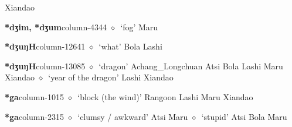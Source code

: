          Xiandao 
  \item {\footnotesize \textbf{*dʒim, *dʒum}}{\tiny column-4344}
         $\diamond$~`fog'
         Maru 
  \item {\footnotesize \textbf{*dʒuŋH}}{\tiny column-12641}
         $\diamond$~`what'
         Bola 
\hspace{1ex}
         Lashi 
  \item {\footnotesize \textbf{*dʒuŋH}}{\tiny column-13085}
         $\diamond$~`dragon'
         Achang\_Longchuan 
\hspace{1ex}
         Atsi 
\hspace{1ex}
         Bola 
\hspace{1ex}
         Lashi 
\hspace{1ex}
         Maru 
\hspace{1ex}
         Xiandao 
\hspace{1ex}
         $\diamond$~`year of the dragon'
         Lashi 
\hspace{1ex}
         Xiandao 
  \item {\footnotesize \textbf{*ga}}{\tiny column-1015}
         $\diamond$~`block (the wind)'
         Rangoon 
\hspace{1ex}
         Lashi 
\hspace{1ex}
         Maru 
\hspace{1ex}
         Xiandao 
  \item {\footnotesize \textbf{*ga}}{\tiny column-2315}
         $\diamond$~`clumsy / awkward'
         Atsi 
\hspace{1ex}
         Maru 
\hspace{1ex}
         $\diamond$~`stupid'
         Atsi 
\hspace{1ex}
         Bola 
\hspace{1ex}
         Maru 

